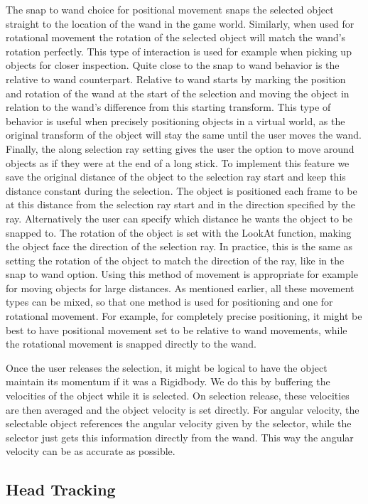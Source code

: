 \documentclass[12pt,a4paper,oneside,pdftex]{report}
\begin{document}
The snap to wand choice for positional movement snaps the selected object straight to the location of the wand in the game world. Similarly, when used for rotational movement the rotation of the selected object will match the wand's rotation perfectly. This type of interaction is used for example when picking up objects for closer inspection. Quite close to the snap to wand behavior is the relative to wand counterpart. Relative to wand starts by marking the position and rotation of the wand at the start of the selection and moving the object in relation to the wand's difference from this starting transform. This type of behavior is useful when precisely positioning objects in a virtual world, as the original transform of the object will stay the same until the user moves the wand. Finally, the along selection ray setting gives the user the option to move around objects as if they were at the end of a long stick. To implement this feature we save the original distance of the object to the selection ray start and keep this distance constant during the selection. The object is positioned each frame to be at this distance from the selection ray start and in the direction specified by the ray. Alternatively the user can specify which distance he wants the object to be snapped to. The rotation of the object is set with the LookAt function, making the object face the direction of the selection ray. In practice, this is the same as setting the rotation of the object to match the direction of the ray, like in the snap to wand option. Using this method of movement is appropriate for example for moving objects for large distances. As mentioned earlier, all these movement types can be mixed, so that one method is used for positioning and one for rotational movement. For example, for completely precise positioning, it might be best to have positional movement set to be relative to wand movements, while the rotational movement is snapped directly to the wand.

Once the user releases the selection, it might be logical to have the object maintain its momentum if it was a Rigidbody. We do this by buffering the velocities of the object while it is selected. On selection release, these velocities are then averaged and the object velocity is set directly. For angular velocity, the selectable object references the angular velocity given by the selector, while the selector just gets this information directly from the wand. This way the angular velocity can be as accurate as possible.

\subsection{Head Tracking}
\label{subsection:wandcontrollers:headtracking}
\end{document}
